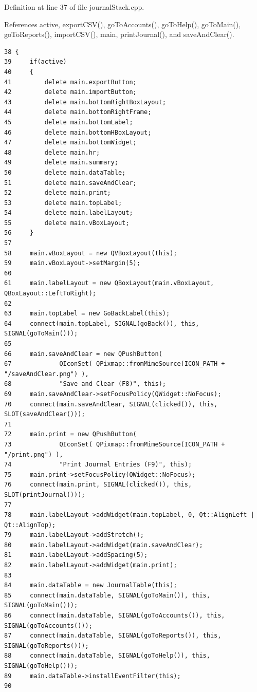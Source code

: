 Definition at line 37 of file journal\-Stack.cpp.

References active, export\-CSV(), go\-To\-Accounts(), go\-To\-Help(), go\-To\-Main(), go\-To\-Reports(), import\-CSV(), main, print\-Journal(), and save\-And\-Clear().

\footnotesize\begin{verbatim}38 {
39     if(active)
40     {
41         delete main.exportButton;
42         delete main.importButton;
43         delete main.bottomRightBoxLayout;
44         delete main.bottomRightFrame;
45         delete main.bottomLabel;
46         delete main.bottomHBoxLayout;
47         delete main.bottomWidget;
48         delete main.hr;
49         delete main.summary;
50         delete main.dataTable;
51         delete main.saveAndClear;
52         delete main.print;
53         delete main.topLabel;
54         delete main.labelLayout;
55         delete main.vBoxLayout;
56     }
57     
58     main.vBoxLayout = new QVBoxLayout(this);
59     main.vBoxLayout->setMargin(5);
60     
61     main.labelLayout = new QBoxLayout(main.vBoxLayout, QBoxLayout::LeftToRight);
62     
63     main.topLabel = new GoBackLabel(this);
64     connect(main.topLabel, SIGNAL(goBack()), this, SIGNAL(goToMain()));
65     
66     main.saveAndClear = new QPushButton(
67             QIconSet( QPixmap::fromMimeSource(ICON_PATH + "/saveAndClear.png") ),
68             "Save and Clear (F8)", this);
69     main.saveAndClear->setFocusPolicy(QWidget::NoFocus);
70     connect(main.saveAndClear, SIGNAL(clicked()), this, SLOT(saveAndClear()));
71     
72     main.print = new QPushButton(
73             QIconSet( QPixmap::fromMimeSource(ICON_PATH + "/print.png") ),
74             "Print Journal Entries (F9)", this);
75     main.print->setFocusPolicy(QWidget::NoFocus);
76     connect(main.print, SIGNAL(clicked()), this, SLOT(printJournal()));
77     
78     main.labelLayout->addWidget(main.topLabel, 0, Qt::AlignLeft | Qt::AlignTop);
79     main.labelLayout->addStretch();
80     main.labelLayout->addWidget(main.saveAndClear);
81     main.labelLayout->addSpacing(5);
82     main.labelLayout->addWidget(main.print);
83     
84     main.dataTable = new JournalTable(this);
85     connect(main.dataTable, SIGNAL(goToMain()), this, SIGNAL(goToMain()));
86     connect(main.dataTable, SIGNAL(goToAccounts()), this, SIGNAL(goToAccounts()));
87     connect(main.dataTable, SIGNAL(goToReports()), this, SIGNAL(goToReports()));
88     connect(main.dataTable, SIGNAL(goToHelp()), this, SIGNAL(goToHelp()));
89     main.dataTable->installEventFilter(this);
90     

\end{verbatim}
